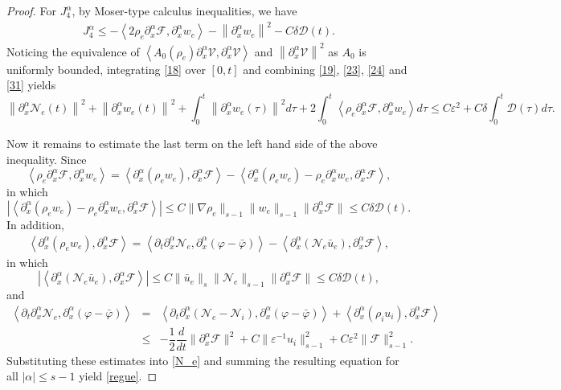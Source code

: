 \documentclass[10pt,a4paper]{amsart}
\newcommand{\D}{\nabla}
\newcommand{\Ne}{\mathcal{N}_e}
\newcommand{\Ni}{\mathcal{N}_i}
\newcommand{\al}{\alpha}
\newcommand{\calf}{\mathcal{F}}
\newcommand{\eps}{\mathbb{\varepsilon}}
\newcommand{\pa}{\partial}
\newcommand{\pt}{\partial_t}
\newcommand{\vp}{\varphi}
\begin{document}
\begin{proof}
For $J_4^\alpha$, by Moser-type calculus inequalities,  we have
\begin{eqnarray}\label{31}
         J_4^\alpha \leq  -\left\langle 2\rho_e \pa_x^\al \calf , \pa_x^\al w_e \right\rangle-  \left\|\pa_x^\al w_e \right\|^2- C\delta\mathcal{D}(t). 
\end{eqnarray}
Noticing the equivalence of $\left< A_0(\rho_e)\pa_x^\al \mathcal{V}, \pa_x^\al \mathcal{V} \right>$ and $\left\|\pa_x^\al \mathcal{V}\right\|^2$ as $A_0$ is uniformly bounded, integrating \eqref{18} over $[0,t]$ and combining \eqref{19}, \eqref{23}, \eqref{24} and \eqref{31} yields
\begin{equation}\label{N_e}
    \left\|\pa_x^\al \mathcal{N}_e(t)\right\|^2+\left\|\pa_x^\al w_e(t)\right\|^2+ \int_{0}^{t}\left\|\pa_x^\al w_e(\tau)\right\|^2 d\tau+2\int_{0}^{t} \left\langle \rho_e \pa_x^\al \calf , \pa_x^\al w_e \right\rangle d\tau \leq  C\eps^2+C\delta \int_0^t \mathcal{D}(\tau)d\tau.
\end{equation}

Now it remains to estimate the last term on the left hand side of the above inequality. Since
\[
\left<\rho_e\pa_x^\al\calf,\pa_x^\al w_e\right>=\left<\pa_x^\al (\rho_e w_e), \pa_x^\al \calf\right>-\left<\pa_x^\al (\rho_e w_e)-\rho_e\pa_x^\al w_e,\pa_x^\al\calf\right>,
\]
in which 
\[
\left|\left<\pa_x^\al (\rho_e w_e)-\rho_e\pa_x^\al w_e,\pa_x^\al\calf\right>\right|\leq C\|\D \rho_e\|_{s-1}\|w_e\|_{s-1}\|\pa_x^\al \calf\|\leq C\delta \mathcal{D}(t).
\]
In addition, 
\begin{eqnarray*}
\left<\pa_x^\al (\rho_e w_e), \pa_x^\al \calf\right>=\left<\pt\pa_x^\al\Ne,\pa_x^\al(\vp-\bar{\vp})\right>-\left<\pa_x^\al(\Ne\bar{u}_e),\pa_x^\al \calf\right>,
\end{eqnarray*}
in which 
\[
\left|\left<\pa_x^\al(\Ne\bar{u}_e),\pa_x^\al \calf\right>\right|\leq C\|\bar{u}_e\|_s\|\Ne\|_{s-1}\|\pa_x^\al \calf\|\leq C\delta\mathcal{D}(t),
\]
and
\begin{eqnarray*}
\left<\pt\pa_x^\al\Ne,\pa_x^\al(\vp-\bar{\vp})\right>&=&\left<\pt\pa_x^\al(\Ne-\Ni),\pa_x^\al(\vp-\bar{\vp})\right>+\left<\pa_x^\al(\rho_iu_i),\pa_x^\al\calf\right>\nonumber\\
&\leq& -\dfrac{1}{2}\dfrac{d}{dt}\|\pa_x^\al\calf\|^2+C\|\eps^{-1}u_i\|_{s-1}^2+C\eps^2\|\calf\|_{s-1}^2.
\end{eqnarray*}
Substituting these estimates into \eqref{N_e} and summing the resulting equation for all $|\al|\leq s-1$ yield \eqref{regue}. 
\end{proof}
\end{document}
